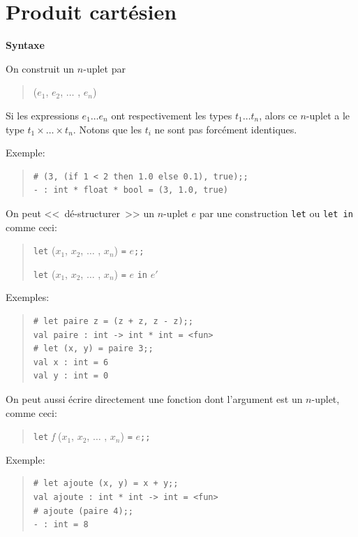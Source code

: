 \documentclass[11pt, a4paper]{article}
\begin{document}
\section{Produit cartésien}

{\bf Syntaxe}

On construit un $n$-uplet par
\begin{quote}
($e_1$, $e_2$, $\ldots\,\,$, $e_n$)
\end{quote}

Si les expressions $e_1 \ldots e_n$ ont respectivement les types $t_1
\ldots t_n$, alors ce $n$-uplet a le type $t_1 \times \ldots \times
t_n$. Notons que les $t_i$ ne sont pas forcément identiques.

Exemple:
\begin{quote}
\begin{verbatim}
# (3, (if 1 < 2 then 1.0 else 0.1), true);;
- : int * float * bool = (3, 1.0, true)
\end{verbatim}
\end{quote}

On peut <<~dé-structurer~>> un $n$-uplet $e$ par une construction
{\tt let} ou {\tt let in} comme ceci:
\begin{quote}
\verb+let+ ($x_1$, $x_2$, $\ldots\,\,$, $x_n$) \verb+=+ $e$\verb+;;+

\verb+let+ ($x_1$, $x_2$, $\ldots\,\,$, $x_n$) \verb+=+ $e$ \verb+in+ $e'$
\end{quote}

Exemples:
\begin{quote}
\begin{verbatim}
# let paire z = (z + z, z - z);;
val paire : int -> int * int = <fun>
# let (x, y) = paire 3;;
val x : int = 6
val y : int = 0
\end{verbatim}
\end{quote}

On peut aussi écrire directement une fonction dont l'argument est un
$n$-uplet, comme ceci:
\begin{quote}
\verb+let+ {\em f} ($x_1$, $x_2$, $\ldots\,\,$, $x_n$) \verb+=+
$e$\verb+;;+
\end{quote}

Exemple:
\begin{quote}
\begin{verbatim}
# let ajoute (x, y) = x + y;;
val ajoute : int * int -> int = <fun>
# ajoute (paire 4);;
- : int = 8
\end{verbatim}
\end{quote}
\end{document}
